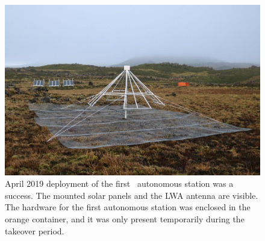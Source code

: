 \begin{figure}
	\centering
	\includegraphics[width=\linewidth]{Figures/station}
	\caption{April 2019 deployment of the first \albatros\ autonomous station was a success. The mounted solar panels and the LWA antenna are visible. The hardware for the first autonomous station was enclosed in the orange container, and it was only present temporarily during the takeover period.}
	\label{Fig:station}
\end{figure}
